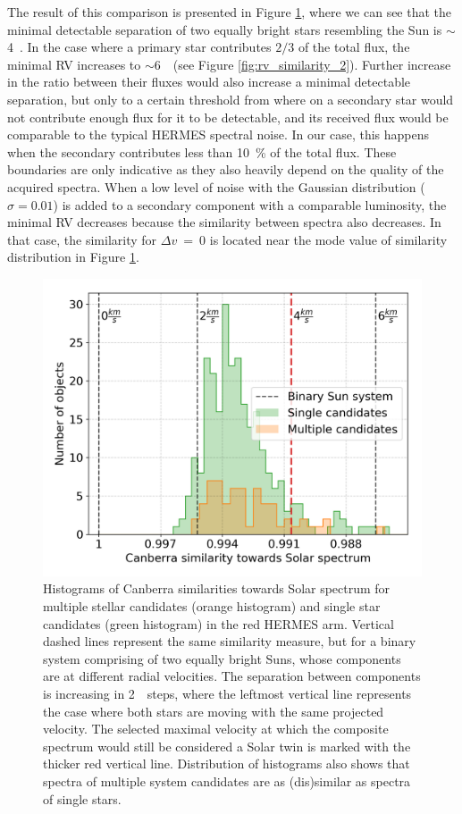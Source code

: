 The result of this comparison is presented in Figure \ref{fig:rv_similarity}, where we can see that the minimal detectable separation of two equally bright stars resembling the Sun is $\sim$4~\kms. In the case where a primary star contributes $2/3$ of the total flux, the minimal RV increases to $\sim$6~\kms\ (see Figure \ref{fig:rv_similarity_2}). Further increase in the ratio between their fluxes would also increase a minimal detectable separation, but only to a certain threshold from where on a secondary star would not contribute enough flux for it to be detectable, and its received flux would be comparable to the typical HERMES spectral noise. In our case, this happens when the secondary contributes less than 10~\% of the total flux. These boundaries are only indicative as they also heavily depend on the quality of the acquired spectra. When a low level of noise with the Gaussian distribution ($\sigma=0.01$) is added to a secondary component with a comparable luminosity, the minimal RV decreases because the similarity between spectra also decreases. In that case, the similarity for $\Delta v$~=~0 is located near the mode value of similarity distribution in Figure \ref{fig:rv_similarity}. 

\begin{figure}
	\centering
	\includegraphics[width=\columnwidth]{sinlg_multi_sim_b3_50_50.png}
	\caption{Histograms of Canberra similarities towards Solar spectrum for multiple stellar candidates (orange histogram) and single star candidates (green histogram) in the red HERMES arm. Vertical dashed lines represent the same similarity measure, but for a binary system comprising of two equally bright Suns, whose components are at different radial velocities. The separation between components is increasing in 2~\kms\ steps, where the leftmost vertical line represents the case where both stars are moving with the same projected velocity. The selected maximal velocity at which the composite spectrum would still be considered a Solar twin is marked with the thicker red vertical line. Distribution of histograms also shows that spectra of multiple system candidates are as (dis)similar as spectra of single stars.}
	\label{fig:rv_similarity}
\end{figure}

